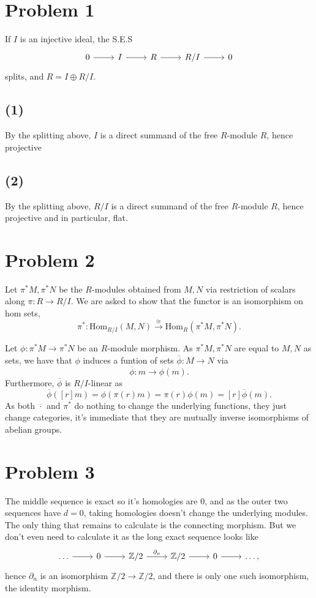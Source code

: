 \documentclass{article}
\theoremstyle{definition}
\newcommand{\Z}{\mathbb{Z}}
\newcommand{\Hom}{\text{Hom}}
\begin{document}
\section*{Problem 1}

If $I$ is an injective ideal, the S.E.S
\[
\begin{tikzcd}
	0
	\ar{r}
	& I
	\ar{r}
	& R
	\ar{r}
	& R/I
	\ar{r}
	& 0
\end{tikzcd}
\] 
splits, and $R = I \oplus R/I$.

\subsection*{(1)}
By the splitting above, $I$ is a direct summand of the free $R$-module $R$,
hence projective

\subsection*{(2)}
By the splitting above, $R/I$ is a direct summand of the free $R$-module $R$,
hence projective and in particular, flat.

\section*{Problem 2}

Let $\pi^{*}M, \pi^{*}N$ be the $R$-modules obtained from $M, N$ via
restriction of scalars along $\pi : R \to R/I$. We are asked to show that the
functor is an isomorphism on hom sets,
\[
	\pi^{*} : \Hom_{R/I}(M, N) \xrightarrow{\cong} \Hom_{R}(\pi^{*}M, \pi^{*}N).
\] 

Let $\phi : \pi^{*}M \to \pi^{*}N$ be an $R$-module morphism. As $\pi^{*}M,
\pi^{*}N$ are equal to $M, N$ as sets, we have that $\phi$ induces a funtion of
sets $\overline{\phi} : M \to N$ via 
\[
	\overline{\phi} : m \to \phi(m).
\] 
Furthermore, $\overline{\phi}$ is $R/I$-linear as 
\[
	\overline{\phi}([r]m)
	=
	\phi(\pi(r)m)
	=
	\pi(r)\phi(m)
	=
	[r]\overline{\phi}(m).
\] 
As both $\overline{\cdot}$ and $\pi^{*}$ do nothing to change the underlying
functions, they just change categories, it's immediate that they are mutually
inverse isomorphisms of abelian groups.

\section*{Problem 3}

The middle sequence is exact so it's homologies are $0$, and as the outer two
sequences have $d = 0$, taking homologies doesn't change the underlying
modules. The only thing that remains to calculate is the connecting morphism.
But we don't even need to calculate it as the long exact sequence looks like
\[
\begin{tikzcd}
	\ldots
	\ar{r}
	& 0
	\ar{r}
	& \Z/2
	\ar{r}{\partial_{n}}
	& \Z/2
	\ar{r}
	& 0
	\ar{r}
	& \ldots,
\end{tikzcd}
\] 
hence $\partial_{n}$ is an isomorphism $\Z/2 \to \Z/2$, and there is only one
such isomorphism, the identity morphism.
\end{document}
